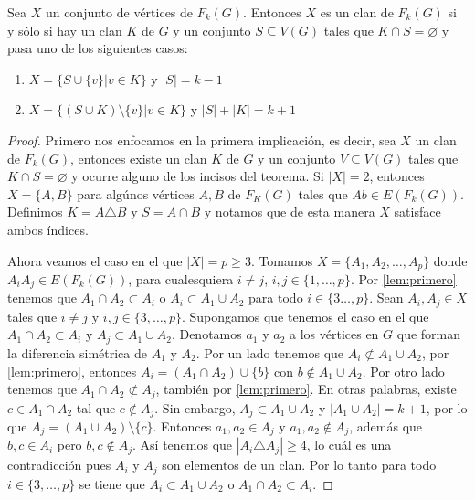     \begin{teorema}
        \label{teo:segundo}
        Sea $X$ un conjunto de v\'ertices de $F_k(G)$. Entonces $X$ es un clan
        de $F_k(G)$ si y s\'olo si hay un clan $K$ de $G$ y un conjunto $S
        \subseteq V(G)$ tales que $K \cap S = \varnothing$ y pasa uno de los
        siguientes casos:
        \begin{enumerate}
            \item $X = \{S \cup \{v\}| v \in K\}$ y $|S| = k-1$
            \item $X = \{(S\cup K) \setminus \{v\}| v \in K \}$ y $|S| + |K| =
            k+1$
        \end{enumerate}
    \end{teorema}

    \begin{proof}
        Primero nos enfocamos en la primera implicaci\'on, es decir, sea $X$ un
        clan de $F_k(G)$, entonces existe un clan $K$ de $G$ y un conjunto $V
        \subseteq V(G)$ tales que $K \cap S = \varnothing$ y ocurre alguno de
        los incisos del teorema. Si $|X|=2$, entonces $X= \{A, B\}$ para
        alg\'unos v\'ertices $A, B$ de $F_K(G)$ tales que $Ab \in E(F_k(G))$.
        Definimos $K = A \triangle B$ y $S=A \cap B$ y notamos que de esta
        manera $X$ satisface ambos \'indices.

        Ahora veamos el caso en el que $|X|= p \geq 3$. Tomamos $X=\{A_1, A_2,
        \dots, A_p\}$ donde $A_iA_j \in E(F_k(G))$, para cualesquiera $i\neq j$,
        $i,j \in \{1, \dots, p\}$. Por \cref*{lem:primero} tenemos que $A_1\cap
        A_2 \subset A_i$ o $A_i \subset A_1 \cup A_2$ para todo $i \in \{3
        \dots,p \}$. Sean $A_i, A_j \in X$ tales que $i \neq j$ y $i, j \in \{3,
        \dots, p\}$. Supongamos que tenemos el caso en el que $A_1\cap A_2
        \subset A_i$ y $A_j \subset A_1 \cup A_2$. Denotamos $a_1$ y $a_2$ a los
        v\'ertices en $G$ que forman la diferencia sim\'etrica de $A_1$ y $A_2$.
        Por un lado tenemos que $A_i \not\subset A_1\cup A_2$, por
        \cref*{lem:primero}, entonces $A_i = (A_1\cap A_2) \cup \{b\}$ con $b
        \notin A_1\cup A_2$. Por otro lado tenemos que $A_1 \cap A_2 \not\subset
        A_j$, tambi\'en por \cref*{lem:primero}. En otras palabras, existe $c
        \in A_1 \cap A_2$ tal que $c \notin A_j$. Sin embargo, $A_j \subset A_1
        \cup A_2$ y $|A_1 \cup A_2| =k+1$, por lo que $A_j = (A_1 \cup
        A_2)\setminus \{c\}$. Entonces $a_1, a_2 \in A_j$ y $a_1, a_2 \notin
        A_j$, adem\'as que $b, c \in A_i$ pero $b, c \notin A_j$. As\'i tenemos
        que $|A_i \triangle A_j| \geq 4$, lo cu\'al es una contradicci\'on pues
        $A_i$ y $A_j$ son elementos de un clan. Por lo tanto para todo $i\in
        \{3, \dots, p\}$ se tiene que $A_i \subset A_1\cup A_2$ o $A_1 \cap A_2
        \subset A_i$.


\end{proof}
